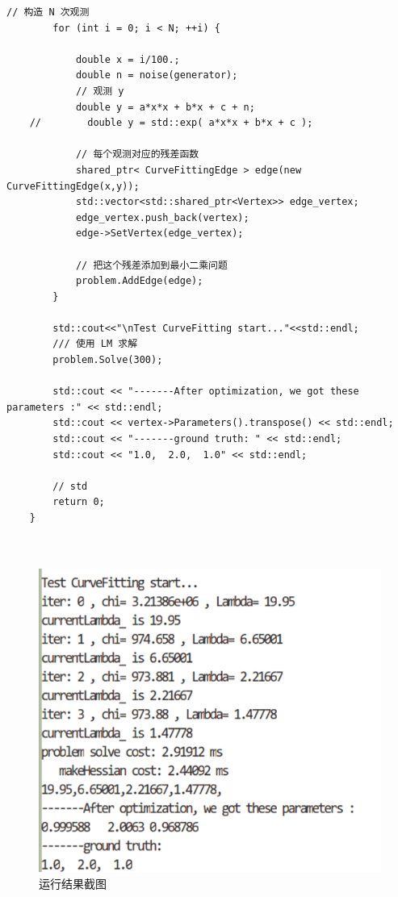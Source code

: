 \documentclass[oneside]{article}
\begin{document}
\begin{lstlisting}[caption={}]
        // 构造 N 次观测
        for (int i = 0; i < N; ++i) {
    
            double x = i/100.;
            double n = noise(generator);
            // 观测 y
            double y = a*x*x + b*x + c + n;
    //        double y = std::exp( a*x*x + b*x + c );
    
            // 每个观测对应的残差函数
            shared_ptr< CurveFittingEdge > edge(new CurveFittingEdge(x,y));
            std::vector<std::shared_ptr<Vertex>> edge_vertex;
            edge_vertex.push_back(vertex);
            edge->SetVertex(edge_vertex);
    
            // 把这个残差添加到最小二乘问题
            problem.AddEdge(edge);
        }
    
        std::cout<<"\nTest CurveFitting start..."<<std::endl;
        /// 使用 LM 求解
        problem.Solve(300);
    
        std::cout << "-------After optimization, we got these parameters :" << std::endl;
        std::cout << vertex->Parameters().transpose() << std::endl;
        std::cout << "-------ground truth: " << std::endl;
        std::cout << "1.0,  2.0,  1.0" << std::endl;
    
        // std
        return 0;
    }
    
    
\end{lstlisting}

\begin{figure}[htbp]
    \centering
    \includegraphics[width=.5\linewidth]{figures/fig2.png}    
    \caption{运行结果截图}
\end{figure}
\clearpage
\end{document}
